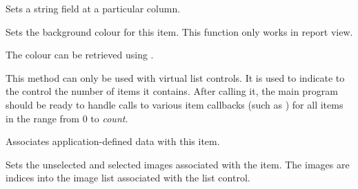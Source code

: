 
Sets a string field at a particular column.


\label{wxlistctrlsetitembackgroundcolour}


Sets the background colour for this item. This function only works in report view.

The colour can be retrieved using 
.



\label{wxlistctrlsetitemcount}


This method can only be used with virtual list controls. It is used to indicate
to the control the number of items it contains. After calling it, the main
program should be ready to handle calls to various item callbacks (such as
) for all items in the range
from $0$ to {\it count}.


\label{wxlistctrlsetitemdata}


Associates application-defined data with this item.


\label{wxlistctrlsetitemimage}


Sets the unselected and selected images associated with the item. The images are indices into the
image list associated with the list control.


